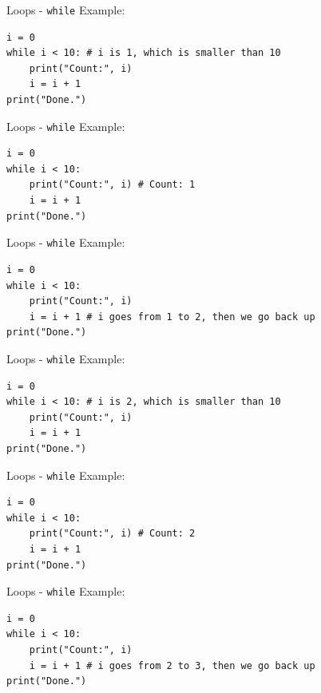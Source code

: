 \documentclass[dvipsnames, svgnames, x11names, handout]{beamer}
\begin{document}
\begin{frame}[fragile]{Loops - \texttt{while}}
Example:
\begin{verbatim}
i = 0
while i < 10: # i is 1, which is smaller than 10
    print("Count:", i)
    i = i + 1
print("Done.")
\end{verbatim}
\end{frame}

\addtocounter{framenumber}{-1}

\begin{frame}[fragile]{Loops - \texttt{while}}
Example:
\begin{verbatim}
i = 0
while i < 10: 
    print("Count:", i) # Count: 1
    i = i + 1
print("Done.")
\end{verbatim}
\end{frame}

\addtocounter{framenumber}{-1}

\begin{frame}[fragile]{Loops - \texttt{while}}
Example:
\begin{verbatim}
i = 0
while i < 10: 
    print("Count:", i)
    i = i + 1 # i goes from 1 to 2, then we go back up
print("Done.")
\end{verbatim}
\end{frame}

\addtocounter{framenumber}{-1}

\begin{frame}[fragile]{Loops - \texttt{while}}
Example:
\begin{verbatim}
i = 0
while i < 10: # i is 2, which is smaller than 10
    print("Count:", i)
    i = i + 1
print("Done.")
\end{verbatim}
\end{frame}

\addtocounter{framenumber}{-1}

\begin{frame}[fragile]{Loops - \texttt{while}}
Example:
\begin{verbatim}
i = 0
while i < 10: 
    print("Count:", i) # Count: 2
    i = i + 1
print("Done.")
\end{verbatim}
\end{frame}

\addtocounter{framenumber}{-1}

\begin{frame}[fragile]{Loops - \texttt{while}}
Example:
\begin{verbatim}
i = 0
while i < 10: 
    print("Count:", i)
    i = i + 1 # i goes from 2 to 3, then we go back up
print("Done.")
\end{verbatim}
\end{frame}
\end{document}
